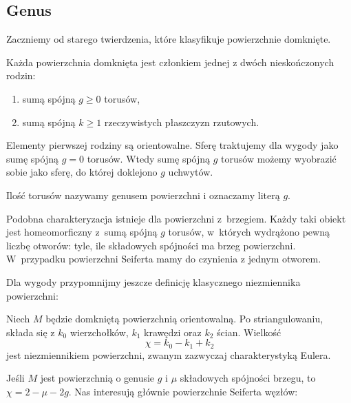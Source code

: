 \subsection{Genus} %
\label{sec:genus}
Zaczniemy od starego twierdzenia, które klasyfikuje powierzchnie domknięte.

\begin{proposition}
    Każda powierzchnia domknięta jest członkiem jednej z dwóch nieskończonych rodzin:
    \begin{enumerate}[leftmargin=*]
        \itemsep0em
        \item sumą spójną $g \ge 0$ torusów,
        \item sumą spójną $k \ge 1$ rzeczywistych płaszczyzn rzutowych.
    \end{enumerate}
\end{proposition}

Elementy pierwszej rodziny są orientowalne.
Sferę traktujemy dla wygody jako sumę spójną $g = 0$ torusów.
Wtedy sumę spójną $g$ torusów możemy wyobrazić sobie jako sferę, do której doklejono $g$ uchwytów.

\begin{definition}
    Ilość torusów nazywamy genusem powierzchni i oznaczamy literą $g$.
\end{definition}

Podobna charakteryzacja istnieje dla powierzchni z~brzegiem.
Każdy taki obiekt jest homeomorficzny z~sumą spójną $g$ torusów, w~których wydrążono pewną liczbę otworów: tyle, ile składowych spójności ma brzeg powierzchni.
W~przypadku powierzchni Seiferta mamy do czynienia z jednym otworem.

Dla wygody przypomnijmy jeszcze definicję klasycznego niezmiennika powierzchni:

\begin{definition}
    Niech $M$ będzie domkniętą powierzchnią orientowalną.
    Po striangulowaniu, składa się z $k_0$ wierzchołków, $k_1$ krawędzi oraz $k_2$ ścian.
    Wielkość
    \begin{equation}
        \chi = k_0 - k_1 + k_2
    \end{equation}
    jest niezmiennikiem powierzchni, zwanym zazwyczaj charakterystyką Eulera.
\end{definition}

Jeśli $M$ jest powierzchnią o genusie $g$ i $\mu$ składowych spójności brzegu, to $\chi = 2 - \mu - 2g$.
Nas interesują głównie powierzchnie Seiferta węzłów:


